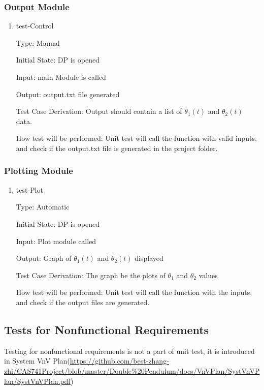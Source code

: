 \documentclass[12pt, titlepage]{article}
\begin{document}
\subsubsection{Output Module} \label{test_output}
\begin{enumerate}

\item{test-Control\\}

Type: Manual
          
Initial State: DP is opened
          
Input: main Module is called
          
Output: output.txt file generated  

Test Case Derivation: Output should contain a list of $\theta_1(t)$ and $\theta_2(t)$ data.

How test will be performed: Unit test will call the function with valid inputs, and check if the output.txt file is generated in the project folder. 
          
\end{enumerate}

\subsubsection{Plotting Module} \label{test_plot}
\begin{enumerate}

\item{test-Plot\\}

Type: Automatic
          
Initial State: DP is opened
          
Input: Plot module called
          
Output: Graph of $\theta_1(t)$ and $\theta_2(t)$ displayed

Test Case Derivation: The graph be the plots of $\theta_1$ and $\theta_2$ values 

How test will be performed: Unit test will call the function with the inputs, and check if the output files are generated.
\end{enumerate}    

\subsection{Tests for Nonfunctional Requirements}
Testing for nonfunctional requirements is not a part of unit test, it is introduced in System VnV Plan(\url{https://github.com/best-zhang-zhi/CAS741Project/blob/master/Double%20Pendulum/docs/VnVPlan/SystVnVPlan/SystVnVPlan.pdf})
 
\end{document}
